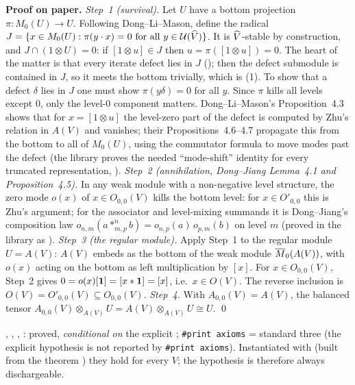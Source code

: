 \textbf{Proof on paper.} \emph{Step~1 (survival).} Let $U$ have a bottom projection $\pi:M_0(U)\to U$. Following Dong--Li--Mason,
define the radical $J = \{x\in M_0(U): \pi(y\cdot x) = 0\text{ for all }y\in\mathcal{U}(\widehat{V})\}$. It is
$\widehat{V}$-stable by construction, and $J\cap(1\otimes U) = 0$: if $[1\otimes u]\in J$ then $u = \pi([1\otimes u]) = 0$. The heart
of the matter is that every iterate defect lies in $J$ (); then the defect submodule is
contained in $J$, so it meets the bottom trivially, which is (1). To show that a defect $\delta$ lies in $J$ one must show
$\pi(y\delta) = 0$ for all $y$. Since $\pi$ kills all levels except $0$, only the level-$0$ component matters. Dong--Li--Mason's
Proposition~4.3 shows that for $x = [1\otimes u]$ the level-zero part of the defect is computed by Zhu's relation in $A(V)$ and
vanishes; their Propositions~4.6--4.7 propagate this from the bottom to all of $M_0(U)$, using the commutator formula to move
modes past the defect (the library proves the needed ``mode-shift'' identity for every truncated representation,
). \emph{Step~2 (annihilation, Dong--Jiang Lemma~4.1 and Proposition~4.5).} In any weak module with
a non-negative level structure, the zero mode $o(x)$ of $x\in O_{0,0}(V)$ kills the bottom level: for $x\in O'_{0,0}$ this is Zhu's
argument; for the associator and level-mixing summands it is Dong--Jiang's composition law
$o_{n,m}(a*^n_{m,p}b) = o_{n,p}(a)\,o_{p,m}(b)$ on level $m$ (proved in the library as ).
\emph{Step~3 (the regular module).} Apply Step~1 to the regular module $U = A(V)$: $A(V)$ embeds as the bottom of the weak module
$\overline{M}_0(A(V))$, with $o(x)$ acting on the bottom as left multiplication by $[x]$. For $x\in O_{0,0}(V)$, Step~2 gives
$0 = o(x)[\mathbf{1}] = [x*\mathbf{1}] = [x]$, i.e.\ $x\in O(V)$. The reverse inclusion is $O(V) = O'_{0,0}(V)\subseteq O_{0,0}(V)$.
\emph{Step~4.} With $A_{0,0}(V) = A(V)$, the balanced tensor $A_{0,0}(V)\otimes_{A(V)}U = A(V)\otimes_{A(V)}U\cong U$. \qed

\begin{status}
, , ,
: proved, \emph{conditional on} the explicit ; \texttt{\#print axioms} = standard
three (the explicit hypothesis is not reported by \texttt{\#print axioms}). Instantiated with  (built from the
theorem ) they hold for every $V$; the  hypothesis is therefore always dischargeable.
\end{status}

